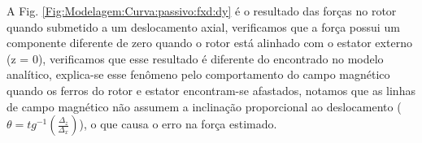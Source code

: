 
A Fig. \ref{Fig:Modelagem:Curva:passivo:fxd:dy} é o resultado das forças no rotor quando submetido a um deslocamento axial, verificamos que a força possui um componente diferente de zero quando o rotor está alinhado com o estator externo (z = 0), verificamos que esse resultado é diferente do encontrado no modelo analítico, explica-se esse fenômeno pelo comportamento do campo magnético quando os ferros do rotor e estator encontram-se afastados, notamos que as linhas de campo magnético não assumem a inclinação proporcional ao deslocamento  ($\theta = tg^{-1}(\frac{\Delta_z}{\Delta_x})$), o que causa o erro na força estimado.



